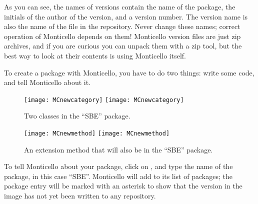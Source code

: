 \documentclass[a4paper,10pt,twoside]{book}
\begin{document}
As you can see, the names of versions contain the name of the package, the initials of the author of the version, and a version number.  The version name is also the name of the file in the repository.  Never change these names; correct operation of Monticello depends on them!   Monticello version files are just zip archives, and if you are curious you can unpack them with a zip tool, but the best way to look at their contents is using Monticello itself.  

To create a package with Monticello, you have to do two things: write some code, and tell Monticello about it.


\begin{figure}[btp]
	\begin{center}
	\ifluluelse
		{\texttt{[image: MCnewcategory]}}
		{\texttt{[image: MCnewcategory]}}
	\end{center}
	\caption{Two classes in the ``SBE'' package.}
	\label{fig:MCnewcategory}
\end{figure}

\begin{figure}[btp]
	\begin{center}
	\ifluluelse
		{\texttt{[image: MCnewmethod]}}
		{\texttt{[image: MCnewmethod]}}
	\end{center}
	\caption{An extension method that will also be in the ``SBE'' package.}
	\label{fig:MCnewmethod}
\end{figure}

To tell Monticello about your package, click on , and type the name of the package, in this case ``SBE''.  Monticello will add  to its list of packages; the package entry will be marked with an asterisk to show that the version in the image has not yet been written to any repository.
\end{document}
